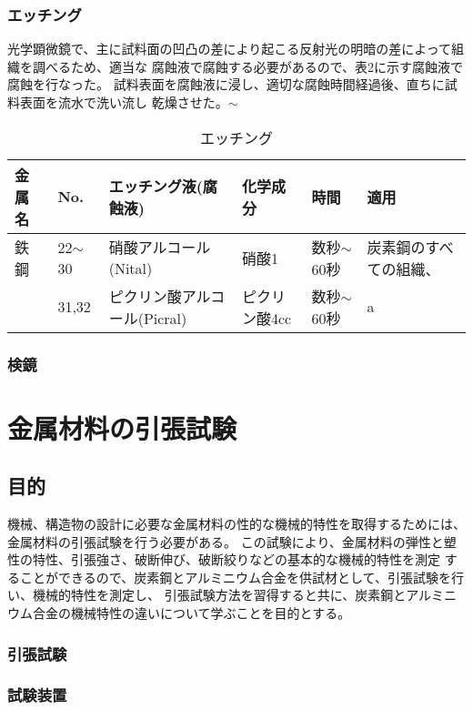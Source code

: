 \documentclass[10pt,a4j]{jsarticle}
\begin{document}
    \subsubsection{エッチング}
    光学顕微鏡で、主に試料面の凹凸の差により起こる反射光の明暗の差によって組織を調べるため、適当な
    腐蝕液で腐蝕する必要があるので、表2に示す腐蝕液で腐蝕を行なった。 
    試料表面を腐蝕液に浸し、適切な腐蝕時間経過後、直ちに試料表面を流水で洗い流し
    乾燥させた。$\sim$
    \begin{table}[H]
      \centering
      \caption{エッチング}
      \label{my-label}
      \footnotesize
      \begin{tabular}{llllll}
        金属名 & No.        & エッチング液(腐蝕液)        & 化学成分     & 時間 & 適用          \\ \hline
        鉄鋼  & 22$\sim$30 & 硝酸アルコール(Nital)     & 硝酸1      & 数秒$\sim$60秒 & 炭素鋼のすべての組織、 \\
            & 31,32      & ピクリン酸アルコール(Picral) & ピクリン酸4cc & 数秒$\sim$60秒 & a          
      \end{tabular}
    \end{table}
    \subsubsection{検鏡}
  
  
\section{金属材料の引張試験}
  \subsection{目的}
  機械、構造物の設計に必要な金属材料の性的な機械的特性を取得するためには、金属材料の引張試験を行う必要がある。
  この試験により、金属材料の弾性と塑性の特性、引張強さ、破断伸び、破断絞りなどの基本的な機械的特性を測定
  することができるので、炭素鋼とアルミニウム合金を供試材として、引張試験を行い、機械的特性を測定し、
  引張試験方法を習得すると共に、炭素鋼とアルミニウム合金の機械特性の違いについて学ぶことを目的とする。
  \subsubsection{引張試験}
  \subsubsection{試験装置}
\end{document}
